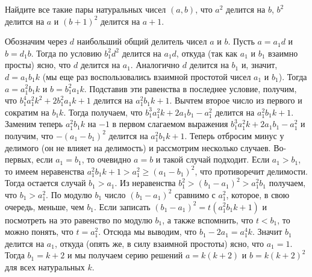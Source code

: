 \problem
Найдите все такие пары натуральных чисел $(a, b)$, что
$a^2$ делится на $b$,
$b^2$ делится на $a$
и $(b + 1)^2$ делится на $a + 1$.

\solution
Обозначим через $d$ наибольший общий делитель чисел $a$ и $b$.
Пусть $a = a_1 d$ и $b = d_1 b$.
Тогда по условию $b_1^2 d^2$ делится на $a_1 d$, откуда
(так как $a_1$ и $b_1$ взаимно просты)
ясно, что $d$ делится на $a_1$.
Аналогично $d$ делится на $b_1$ и, значит, $d = a_1 b_1 k$
(мы еще раз воспользовались взаимной простотой чисел $a_1$ и $b_1$).
Тогда $a = a_1^2 b_1 k$ и $b = b_1^2 a_1 k$.
Подставив эти равенства в последнее условие, получим, что
$b_1^4 a_1^2 k^2 + 2 b_1^2 a_1 k + 1$
делится на $a_1^2 b_1 k + 1$.
Вычтем второе число из первого и сократим на $b_1 k$.
Тогда получаем, что
$b_1^3 a_1^2 k + 2 a_1 b_1 - a_1^2$
делится на $a_1^2 b_1 k + 1$.
Заменим теперь $a_1^2 b_1 k$ на $-1$ в первом слагаемом выражения
$b_1^3 a_1^2 k + 2 a_1 b_1 - a_1^2$ и получим, что $-(a_1 - b_1)^2$ делится на
$a_1^2 b_1 k + 1$.
Теперь отбросим минус у делимого (он не влияет на делимость) и рассмотрим
несколько случаев.
Во-первых, если $a_1 = b_1$, то очевидно $a = b$ и такой случай подходит.
Если $a_1 > b_1$, то имеем неравенства
$a_1^2 b_1 k + 1 > a_1^2 \geq (a_1 - b_1)^2$,
что противоречит делимости.
Тогда остается случай $b_1 > a_1$.
Из неравенства
$b_1^2 > (b_1 - a_1)^2 > a_1^2 b_1$
получаем, что $b_1 > a_1^2$.
По модулю $b_1$ число $(b_1 - a_1)^2$ сравнимо с $a_1^2$,
которое, в свою очередь, меньше, чем $b_1$.
Если записать
$(b_1 - a_1)^2 = t (a_1^2 b_1 k+1)$ и посмотреть на это равенство
по модулю $b_1$, а также вспомнить, что $t < b_1$, то можно понять, что
$t = a_1^2$.
Отсюда мы выводим, что $b_1 - 2 a_1 = a_1^4 k$.
Значит $b_1$ делится на $a_1$, откуда (опять же, в силу взаимной простоты)
ясно, что $a_1 = 1$.
Тогда $b_1 = k + 2$ и мы получаем серию решений
$a = k (k + 2)$ и $b = k (k + 2)^2$ для всех натуральных $k$. 

\endproblem
